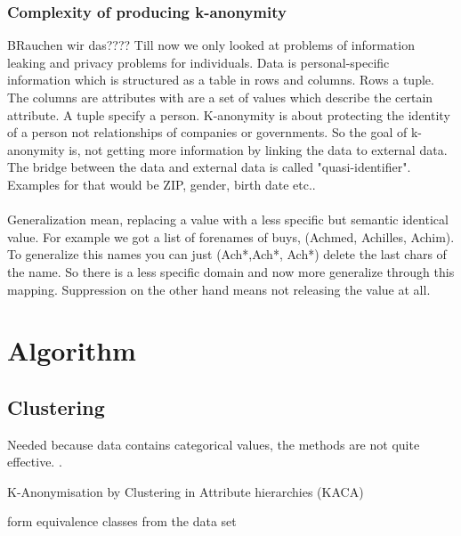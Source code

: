 \documentclass{llncs}
\begin{document}
\subsubsection{Complexity of producing k-anonymity}
BRauchen wir das????
Till now we only looked at problems of information leaking and privacy problems for individuals. Data is personal-specific information which is structured as a table in rows and columns. Rows a tuple. The columns are attributes with are a set of values which describe the certain attribute. A tuple specify a person. K-anonymity is about protecting the identity of a person not relationships of companies or governments. So the goal of k-anonymity is, not getting more information by linking the data to external data. The bridge between the data and external data is called "quasi-identifier". Examples for that would be ZIP, gender, birth date etc.. \\
\\
Generalization mean, replacing a value with a less specific but semantic identical value. For example we got a list of forenames of buys, (Achmed, Achilles, Achim). To generalize this names you can just (Ach*,Ach*, Ach*) delete the last chars of the name. So there is a less specific domain and now more generalize through this mapping. Suppression on the other hand means not releasing the value at all.
\section{Algorithm}
\subsection{Clustering}
Needed because data contains categorical values, the methods are not quite effective.
\cite{li2006achieving}.\\
\begin{algorithm}[H]
	\caption{K-Anonymisation by Clustering in Attribute hierarchies (KACA)}
	form equivalence classes from the data set\\
	
\end{algorithm}
\end{document}
